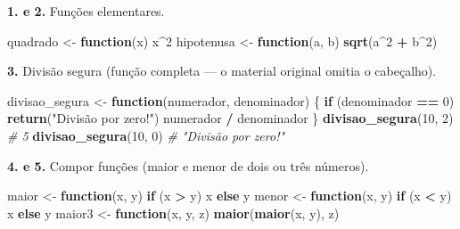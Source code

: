 \documentclass[
  portuguese,
  11pt,
  openany]{book}
\newenvironment{Shaded}{\begin{snugshade}}{\end{snugshade}}
\newcommand{\CommentTok}[1]{\textcolor[rgb]{0.56,0.35,0.01}{\textit{#1}}}
\newcommand{\ControlFlowTok}[1]{\textcolor[rgb]{0.13,0.29,0.53}{\textbf{#1}}}
\newcommand{\DecValTok}[1]{\textcolor[rgb]{0.00,0.00,0.81}{#1}}
\newcommand{\FunctionTok}[1]{\textcolor[rgb]{0.13,0.29,0.53}{\textbf{#1}}}
\newcommand{\NormalTok}[1]{#1}
\newcommand{\OtherTok}[1]{\textcolor[rgb]{0.56,0.35,0.01}{#1}}
\newcommand{\SpecialCharTok}[1]{\textcolor[rgb]{0.81,0.36,0.00}{\textbf{#1}}}
\newcommand{\StringTok}[1]{\textcolor[rgb]{0.31,0.60,0.02}{#1}}
\begin{document}
\textbf{1. e 2.} Funções elementares.

\begin{Shaded}
\begin{Highlighting}[]
\NormalTok{quadrado }\OtherTok{\textless{}{-}} \ControlFlowTok{function}\NormalTok{(x) x}\SpecialCharTok{\^{}}\DecValTok{2}
\NormalTok{hipotenusa }\OtherTok{\textless{}{-}} \ControlFlowTok{function}\NormalTok{(a, b) }\FunctionTok{sqrt}\NormalTok{(a}\SpecialCharTok{\^{}}\DecValTok{2} \SpecialCharTok{+}\NormalTok{ b}\SpecialCharTok{\^{}}\DecValTok{2}\NormalTok{)}
\end{Highlighting}
\end{Shaded}

\textbf{3.} Divisão segura (função completa --- o material original omitia o cabeçalho).

\begin{Shaded}
\begin{Highlighting}[]
\NormalTok{divisao\_segura }\OtherTok{\textless{}{-}} \ControlFlowTok{function}\NormalTok{(numerador, denominador) \{}
  \ControlFlowTok{if}\NormalTok{ (denominador }\SpecialCharTok{==} \DecValTok{0}\NormalTok{) }\FunctionTok{return}\NormalTok{(}\StringTok{"Divisão por zero!"}\NormalTok{)}
\NormalTok{  numerador }\SpecialCharTok{/}\NormalTok{ denominador}
\NormalTok{\}}
\FunctionTok{divisao\_segura}\NormalTok{(}\DecValTok{10}\NormalTok{, }\DecValTok{2}\NormalTok{)   }\CommentTok{\# 5}
\FunctionTok{divisao\_segura}\NormalTok{(}\DecValTok{10}\NormalTok{, }\DecValTok{0}\NormalTok{)   }\CommentTok{\# "Divisão por zero!"}
\end{Highlighting}
\end{Shaded}

\textbf{4. e 5.} Compor funções (maior e menor de dois ou três números).

\begin{Shaded}
\begin{Highlighting}[]
\NormalTok{maior }\OtherTok{\textless{}{-}} \ControlFlowTok{function}\NormalTok{(x, y) }\ControlFlowTok{if}\NormalTok{ (x }\SpecialCharTok{\textgreater{}}\NormalTok{ y) x }\ControlFlowTok{else}\NormalTok{ y}
\NormalTok{menor }\OtherTok{\textless{}{-}} \ControlFlowTok{function}\NormalTok{(x, y) }\ControlFlowTok{if}\NormalTok{ (x }\SpecialCharTok{\textless{}}\NormalTok{ y) x }\ControlFlowTok{else}\NormalTok{ y}
\NormalTok{maior3 }\OtherTok{\textless{}{-}} \ControlFlowTok{function}\NormalTok{(x, y, z) }\FunctionTok{maior}\NormalTok{(}\FunctionTok{maior}\NormalTok{(x, y), z)}
\end{Highlighting}
\end{Shaded}
\end{document}
